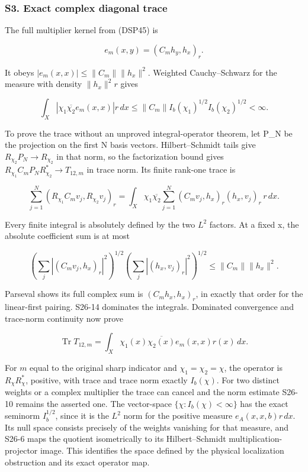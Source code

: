 \documentclass[
  11pt,
]{article}
\makeatletter
\let\ReaderOriginalAnchorStart\hyper@anchorstart
\let\ReaderOriginalAnchorEnd\hyper@anchorend
\let\ReaderPendingAliases\@empty
\def\ReaderArmAliases#1{\gdef\ReaderPendingAliases{#1}}
\def\hyper@anchorstart#1{\ReaderIfNativeAnchorTF{#1}{\ReaderPendingAliases\global\let\ReaderPendingAliases\@empty}{}\ReaderOriginalAnchorStart{#1}}
\makeatother
\begin{document}
\ReaderArmAliases{\ReaderOriginalAnchorStart{s3.-exact-complex-diagonal-trace}\ReaderOriginalAnchorEnd}
\subsubsection{S3. Exact complex diagonal
trace}\label{s3.-exact-complex-diagonal-trace}

The full multiplier kernel from (DSP45) is

\[
e_m(x,y)=(C_mh_y,h_x)_r.
\tag{S26-13}
\]

It obeys \(|e_m(x,x)|\le\|C_m\|\|h_x\|^2\). Weighted Cauchy--Schwarz for
the measure with density \(\|h_x\|^2r\) gives

\[
\int_X|\chi_1\overline{\chi_2}e_m(x,x)|r\,dx
\le\|C_m\|I_b(\chi_1)^{1/2}I_b(\chi_2)^{1/2}<\infty.
\tag{S26-14}
\]

To prove the trace without an unproved integral-operator theorem, let
P\_N be the projection on the first N basis vectors. Hilbert--Schmidt
tails give \(R_{\chi_2}P_N\to R_{\chi_2}\) in that norm, so the
factorization bound gives \(R_{\chi_1}C_mP_NR_{\chi_2}^*\to T_{12,m}\)
in trace norm. Its finite rank-one trace is

\[
\sum_{j=1}^N(R_{\chi_1}C_mv_j,R_{\chi_2}v_j)_r
=\int_X\chi_1\overline{\chi_2}
 \sum_{j=1}^N(C_mv_j,h_x)_r(h_x,v_j)_r\,r\,dx.
\tag{S26-15}
\]

Every finite integral is absolutely defined by the two \(L^2\) factors.
At a fixed x, the absolute coefficient sum is at most

\[
\left(\sum_j|(C_mv_j,h_x)_r|^2\right)^{1/2}
\left(\sum_j|(h_x,v_j)_r|^2\right)^{1/2}
\le\|C_m\|\|h_x\|^2.
\tag{S26-16}
\]

Parseval shows its full complex sum is \((C_mh_x,h_x)_r\), in exactly
that order for the linear-first pairing. S26-14 dominates the integrals.
Dominated convergence and trace-norm continuity now prove

\[
\operatorname{Tr}T_{12,m}
=\int_X\chi_1(x)\overline{\chi_2(x)}e_m(x,x)r(x)\,dx.
\tag{S26-17}
\]

For \(m\) equal to the original sharp indicator and
\(\chi_1=\chi_2=\chi\), the operator is \(R_\chi R_\chi^*\), positive,
with trace and trace norm exactly \(I_b(\chi)\). For two distinct
weights or a complex multiplier the trace can cancel and the norm
estimate S26-10 remains the asserted one. The vector-space
\(\{\chi:I_b(\chi)<\infty\}\) has the exact seminorm \(I_b^{1/2}\),
since it is the \(L^2\) norm for the positive measure
\(e_A(x,x,b)r\,dx\). Its null space consists precisely of the weights
vanishing for that measure, and S26-6 maps the quotient isometrically to
its Hilbert--Schmidt multiplication-projector image. This identifies the
space defined by the physical localization obstruction and its exact
operator map.
\end{document}
